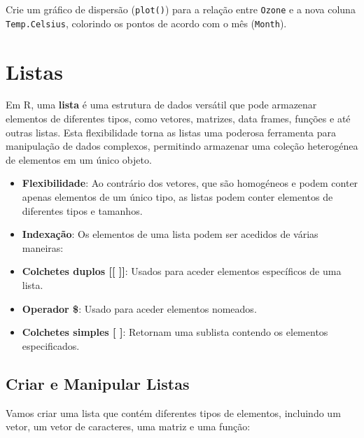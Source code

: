 \documentclass[
]{book}
\providecommand{\tightlist}{%
  \setlength{\itemsep}{0pt}\setlength{\parskip}{0pt}}
\begin{document}
Crie um gráfico de dispersão (\texttt{plot()}) para a relação entre \texttt{Ozone} e a nova coluna \texttt{Temp.Celsius}, colorindo os pontos de acordo com o mês (\texttt{Month}).

\section{Listas}\label{listas}

Em R, uma \textbf{lista} é uma estrutura de dados versátil que pode armazenar
elementos de diferentes tipos, como vetores, matrizes, data frames,
funções e até outras listas. Esta flexibilidade torna as listas uma
poderosa ferramenta para manipulação de dados complexos, permitindo
armazenar uma coleção heterogénea de elementos em um único objeto.

\begin{itemize}
\tightlist
\item
  \textbf{Flexibilidade}: Ao contrário dos vetores, que são homogéneos e
  podem conter apenas elementos de um único tipo, as listas podem
  conter elementos de diferentes tipos e tamanhos.
\item
  \textbf{Indexação}: Os elementos de uma lista podem ser acedidos de
  várias maneiras:
\item
  \textbf{Colchetes duplos {[}{[} {]}{]}}: Usados para aceder elementos específicos
  de uma lista.
\item
  \textbf{Operador \$}: Usado para aceder elementos nomeados.
\item
  \textbf{Colchetes simples {[} {]}}: Retornam uma sublista contendo os
  elementos especificados.
\end{itemize}

\subsection{Criar e Manipular Listas}\label{criar-e-manipular-listas}

Vamos criar uma lista que contém diferentes tipos de elementos,
incluindo um vetor, um vetor de caracteres, uma matriz e uma função:
\end{document}
